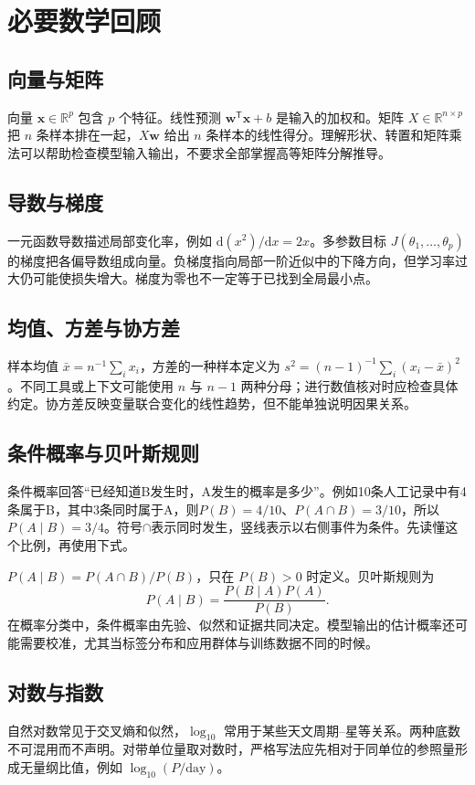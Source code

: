 \chapter{必要数学回顾}
\section{向量与矩阵}
向量 $\mathbf x\in\mathbb R^p$ 包含 $p$ 个特征。线性预测 $\mathbf w^\mathsf T\mathbf x+b$ 是输入的加权和。矩阵 $X\in\mathbb R^{n\times p}$ 把 $n$ 条样本排在一起，$X\mathbf w$ 给出 $n$ 条样本的线性得分。理解形状、转置和矩阵乘法可以帮助检查模型输入输出，不要求全部掌握高等矩阵分解推导。
\section{导数与梯度}
一元函数导数描述局部变化率，例如 $\mathrm d(x^2)/\mathrm dx=2x$。多参数目标 $J(\theta_1,\ldots,\theta_p)$ 的梯度把各偏导数组成向量。负梯度指向局部一阶近似中的下降方向，但学习率过大仍可能使损失增大。梯度为零也不一定等于已找到全局最小点。
\section{均值、方差与协方差}
样本均值 $\bar x=n^{-1}\sum_i x_i$，方差的一种样本定义为 $s^2=(n-1)^{-1}\sum_i(x_i-\bar x)^2$。不同工具或上下文可能使用 $n$ 与 $n-1$ 两种分母；进行数值核对时应检查具体约定。协方差反映变量联合变化的线性趋势，但不能单独说明因果关系。
\section{条件概率与贝叶斯规则}
条件概率回答“已经知道B发生时，A发生的概率是多少”。例如10条人工记录中有4条属于B，其中3条同时属于A，则$P(B)=4/10$、$P(A\cap B)=3/10$，所以$P(A\mid B)=3/4$。符号$\cap$表示同时发生，竖线表示以右侧事件为条件。先读懂这个比例，再使用下式。

$P(A\mid B)=P(A\cap B)/P(B)$，只在 $P(B)>0$ 时定义。贝叶斯规则为
\begin{equation}
P(A\mid B)=\frac{P(B\mid A)P(A)}{P(B)}.
\end{equation}
在概率分类中，条件概率由先验、似然和证据共同决定。模型输出的估计概率还可能需要校准，尤其当标签分布和应用群体与训练数据不同的时候。
\section{对数与指数}
自然对数常见于交叉熵和似然，$\log_{10}$ 常用于某些天文周期--星等关系。两种底数不可混用而不声明。对带单位量取对数时，严格写法应先相对于同单位的参照量形成无量纲比值，例如 $\log_{10}(P/\mathrm{day})$。



